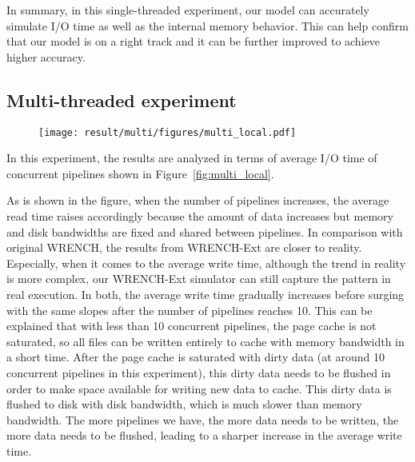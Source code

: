 \documentclass[conference]{IEEEtran}
\newcommand{\tristan}[1]{\color{orange}\textbf{From Tristan:}#1\color{black}}
\begin{document}
			In summary, in this single-threaded experiment, our model can accurately 
			simulate I/O time as well as the internal memory behavior. 
			This can help confirm that our model is on a right track and 
			it can be further improved to achieve higher accuracy.
			
		\subsection{Multi-threaded experiment}
		
			\begin{figure*}		
			\begin{subfigure}{\linewidth}
				\centering
   				\texttt{[image: result/multi/figures/multi\_local.pdf]}
			\end{subfigure}		
			\caption{I/O time of concurrent pipelines with local storage. \tristan{revise caption for real execution variability: "real execution" doesnt tell what the gray shade is.}}
			\label{fig:multi_local}
			\end{figure*}		
			
			In this experiment, the results are analyzed in terms of average I/O time 
			of concurrent pipelines shown in Figure~\ref{fig:multi_local}.
			
			As is shown in the figure, when the number of pipelines increases, 
			the average read time raises accordingly because the amount of data 
			increases but memory and disk bandwidths are fixed and shared between pipelines. 
			In comparison with original WRENCH, the results from WRENCH-Ext are closer 
			to reality. 
			Especially, when it comes to the average write time, 
			although the trend in reality is more complex, our WRENCH-Ext 
			simulator can still capture the pattern in real execution.
			In both, the average write time gradually increases before surging with the 
			same slopes after the number of pipelines reaches 10. 
			This can be explained that with less than 10 concurrent pipelines, 
			the page cache is not saturated, so all files can be written entirely to 
			cache with memory bandwidth in a short time. 
			After the page cache is saturated with dirty data (at around 
			10 concurrent pipelines in this experiment), this dirty data needs 
			to be flushed in order to make space available for writing new data to cache. 
			This dirty data is flushed to disk with disk bandwidth, which is much  
			slower than memory bandwidth. 
			The more pipelines we have, the more data needs to be written, the more data 
			needs to be flushed, leading to a sharper increase in the average write time. 
			
\end{document}
